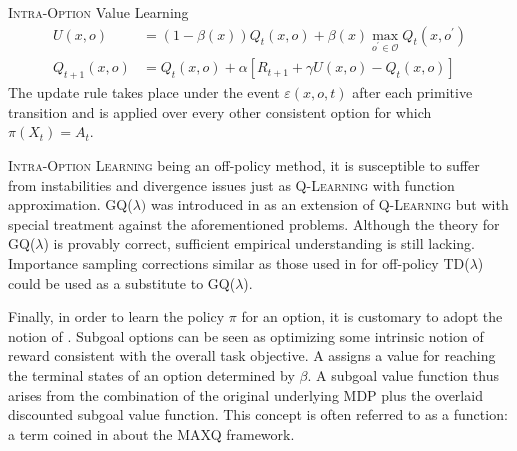\begin{defn}{\textsc{Intra-Option} Value Learning}
\begin{align}
U(x, o) &= (1 - \beta(x))Q_t(x, o) + \beta(x) \max_{o^\prime \in \mathcal{O}} Q_t(x, o^\prime) \\
Q_{t+1}(x, o) &= Q_t(x, o) + \alpha \left[ R_{t+1} + \gamma U(x, o) - Q_t(x, o) \right]
\label{eq:intra-option-learning}
\end{align}
The update rule takes place under the event $\varepsilon(x, o, t)$ after each primitive
transition and is applied over every other consistent option for which $\pi(X_t) = A_t$.
\end{defn}

\textsc{Intra-Option Learning} being an off-policy method, it is susceptible to suffer from instabilities and divergence issues just as \textsc{Q-Learning}
with function approximation. GQ($\lambda)$ was introduced in \cite{Maei2010} as an
extension of \textsc{Q-Learning} but with special treatment against the aforementioned
problems. Although the theory for GQ($\lambda$) is provably correct, sufficient empirical
understanding is still lacking. Importance sampling
corrections similar as those used in \cite{Precup2001} for off-policy TD($\lambda$)
could be used as a substitute to GQ($\lambda$).

Finally, in order to learn the policy $\pi$ for an option, it is customary to adopt the notion of 
. Subgoal options can be seen as optimizing some intrinsic notion of reward
consistent with the overall task objective. A  assigns a
value for reaching the terminal states of an option determined by $\beta$. A subgoal
value function thus arises from the combination of the original underlying MDP plus the
overlaid discounted subgoal value function. This concept is often referred to as a 
 function: a term coined in \cite{Dietterich1999}
about the \textsc{MAXQ} framework.	


